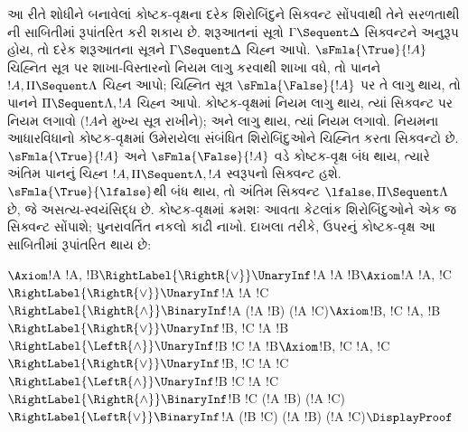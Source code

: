 આ રીતે શોધીને બનાવેલાં કોષ્ટક-વૃક્ષના દરેક
શિરોબિંદુને સિક્વન્ટ સોંપવાથી તેને સરળતાથી
ની સાબિતીમાં રૂપાંતરિત કરી શકાય છે.
શરૂઆતનાં સૂત્રો $\Gamma \Sequent \Delta$
સિક્વન્ટને અનુરૂપ હોય, તો દરેક શરૂઆતના
સૂત્રને $\Gamma \Sequent \Delta$ ચિહ્ન આપો.
$\sFmla{\True}{!A}$ ચિહ્નિત સૂત્ર
પર શાખા-વિસ્તારનો નિયમ લાગુ કરવાથી શાખા
વધે, તો પાનને $!A, \Pi \Sequent \Lambda$
ચિહ્ન આપો; ચિહ્નિત સૂત્ર
$\sFmla{\False}{!A}$ પર તે
લાગુ થાય, તો પાનને $\Pi \Sequent \Lambda, !A$
ચિહ્ન આપો. કોષ્ટક-વૃક્ષમાં
\TRule{\True}{\star} નિયમ લાગુ થાય, ત્યાં
સિક્વન્ટ પર \LeftR{\star} નિયમ લગાવો
($!A$ને મુખ્ય સૂત્ર રાખીને); અને
\TRule{\False}{\star} લાગુ થાય, ત્યાં
\RightR{\star} નિયમ લગાવો. નિયમના
આધારવિધાનો કોષ્ટક-વૃક્ષમાં ઉમેરાયેલા
સંબંધિત શિરોબિંદુઓને ચિહ્નિત કરતા સિક્વન્ટો
છે. $\sFmla{\True}{!A}$ અને
$\sFmla{\False}{!A}$ વડે કોષ્ટક-વૃક્ષ બંધ
થાય, ત્યારે અંતિમ પાનનું ચિહ્ન
$!A, \Pi \Sequent \Lambda, !A$ સ્વરૂપનો
સિક્વન્ટ હશે. $\sFmla{\True}{\lfalse}$થી બંધ
થાય, તો અંતિમ સિક્વન્ટ $\lfalse,\Pi\Sequent\Lambda$
છે, જે અસત્ય-સ્વયંસિદ્ધ છે. કોષ્ટક-વૃક્ષમાં ક્રમશઃ આવતા
કેટલાંક શિરોબિંદુઓને એક જ સિક્વન્ટ સોંપાશે;
પુનરાવર્તિત નકલો કાઢી નાખો. દાખલા તરીકે,
ઉપરનું કોષ્ટક-વૃક્ષ આ સાબિતીમાં રૂપાંતરિત થાય છે:
\begin{maxwidth}
$
\Axiom$!A \fCenter !A, !B$
\RightLabel{\RightR{\lor}}
\UnaryInf$!A \fCenter !A \lor !B$
\Axiom$!A \fCenter !A, !C$
\RightLabel{\RightR{\lor}}
\UnaryInf$!A \fCenter !A \lor !C$
\RightLabel{\RightR{\land}}
\BinaryInf$!A \fCenter (!A \lor !B) \land (!A \lor !C)$
\Axiom$!B, !C \fCenter !A, !B$
\RightLabel{\RightR{\lor}}
\UnaryInf$!B, !C \fCenter !A \lor !B$
\RightLabel{\LeftR{\land}}
\UnaryInf$!B \land !C \fCenter !A \lor !B$
\Axiom$!B, !C \fCenter !A, !C$
\RightLabel{\RightR{\lor}}
\UnaryInf$!B, !C \fCenter !A \lor !C$
\RightLabel{\LeftR{\land}}
\UnaryInf$!B \land !C \fCenter !A \lor !C$
\RightLabel{\RightR{\land}}
\BinaryInf$!B \land !C \fCenter (!A \lor !B) \land
(!A \lor !C)$
\RightLabel{\LeftR{\lor}}
\BinaryInf$!A \lor (!B \land !C) \fCenter (!A \lor !B) \land
(!A \lor !C)$
\DisplayProof$
\end{maxwidth}
\endgroup


\OLEndChapterHook
\endgroup
